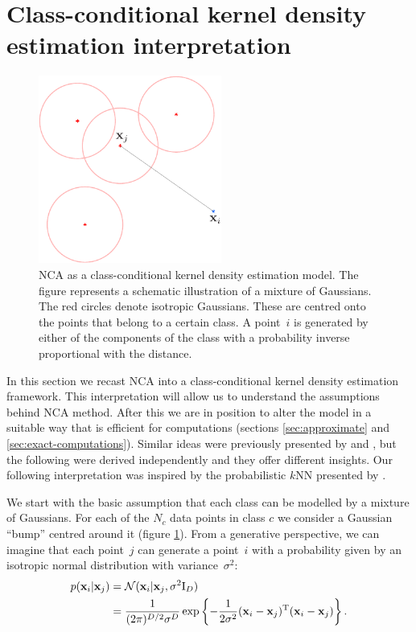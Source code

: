 	
\section{Class-conditional kernel density estimation interpretation}
\label{sec:cc-kde}
	
	\begin{figure}
	  \centering
	  \includegraphics[width=6cm]{images/mog}
	  \caption{NCA as a class-conditional kernel density estimation
	model. The figure represents a schematic illustration of a mixture of Gaussians. The red circles denote isotropic Gaussians. These are centred onto the points that belong to a certain class. A point~$i$ is generated by either of the components of the class with a probability inverse proportional with the distance.}
	  \label{fig:kde}
	\end{figure}
	
	In this section we recast NCA into a class-conditional kernel density
	estimation framework. This interpretation will allow us to understand the assumptions behind NCA method. After this we are in position to alter the model in a suitable way that is efficient for computations (sections \ref{sec:approximate} and \ref{sec:exact-computations}).
	Similar ideas were previously presented by \citet{weinberger2007} and \citet{singh2010}, but the following were derived
	independently and they offer different insights. Our following interpretation
	was inspired by the probabilistic $k$NN presented by \citet{barber2011}.
	
	We start with the basic assumption that each class can be modelled by a mixture
	of Gaussians. For each of the $N_c$ data points in class $c$ we consider a
	Gaussian ``bump'' centred around it (figure \ref{fig:kde}). From a generative perspective, we can imagine
	that each point~$j$ can generate a point~$i$ with a probability given by
	an isotropic normal distribution with variance~$\sigma^2$:
	\begin{align}
	    p(\mathbf{x}_i|\mathbf{x}_j) &= \mathcal{N}(\mathbf{x}_i|\mathbf{x}_j, \sigma^2\mathrm{I}_D) \\
	                   &= \frac{1}{(2\pi)^{D/2}\sigma^D}\exp \left\{-\frac{1}{2\sigma^2}
	(\mathbf{x}_i - \mathbf{x}_j)^\mathrm{T}(\mathbf{x}_i - \mathbf{x}_j)\right\}.
	\end{align}
	
